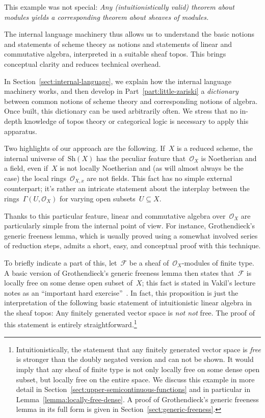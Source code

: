 \documentclass[10pt,reqno,a4paper]{amsbook}
\theoremstyle{definition}
\theoremstyle{plain}
\theoremstyle{remark}
\newcommand{\F}{\mathcal{F}}
\renewcommand{\O}{\mathcal{O}}
\newcommand{\Sh}{\mathrm{Sh}}
\newcommand{\?}{\,{:}\,}
\renewcommand{\_}{\mathpunct{.}\,}
\begin{document}
{This example was not special: \emph{Any (intuitionistically valid) theorem
about modules yields a corresponding theorem about sheaves of modules.}

The internal language machinery thus allows us to understand the basic notions
and statements of scheme theory as notions and statements of linear and
commutative algebra, interpreted in a suitable sheaf topos. This brings
conceptual clarity and reduces technical overhead.

In Section~\ref{sect:internal-language}, we explain how the internal language
machinery works, and then develop in Part~\ref{part:little-zariski} a
\emph{dictionary} between common notions of scheme theory and corresponding
notions of algebra. Once built, this dictionary can be used arbitrarily often.
We stress that no in-depth knowledge of topos theory or categorical logic is
necessary to apply this apparatus.

Two highlights of our approach are the following. If~$X$ is a reduced scheme,
the internal universe of~$\Sh(X)$ has the peculiar feature that~$\O_X$ is
Noetherian and a field, even if~$X$ is not locally Noetherian and (as will
almost always be the case) the local rings~$\O_{X,x}$ are not fields. This fact
has no simple external counterpart; it's rather an intricate statement about
the interplay between the rings~$\Gamma(U, \O_X)$ for varying open subsets~$U
\subseteq X$.

Thanks to this particular feature, linear and commutative algebra over~$\O_X$
are particularly simple from the
internal point of view. For instance, Grothendieck's generic freeness lemma,
which is usually proved using a somewhat involved series of reduction steps,
admits a short, easy, and conceptual proof with this technique.

To briefly indicate a part of this, let~$\F$ be a sheaf of~$\O_X$-modules of finite
type. A basic version of Grothendieck's generic freeness lemma then states
that~$\F$ is locally free on some dense open subset of~$X$; this fact
is stated in Vakil's lecture notes as an ``important hard
exercise''~\cite[Exercise~13.7.K]{vakil:foag}. In fact, this proposition is just the
interpretation of the following basic statement of intuitionistic linear algebra in
the sheaf topos: Any finitely generated vector space is \emph{not not} free.
The proof of this statement is entirely straightforward.\footnote{Intuitionistically,
the statement that any finitely generated vector space is \emph{free} is stronger than
the doubly negated version and can not be shown. It would imply that any sheaf
of finite type is not only locally free on some dense open subset, but locally
free on the entire space. We discuss this example in more detail in
Section~\ref{sect:upper-semicontinuous-functions} and in particular in
Lemma~\ref{lemma:locally-free-dense}. A proof of Grothendieck's generic
freeness lemma in its full form is given in
Section~\ref{sect:generic-freeness}.}

}
\end{document}
